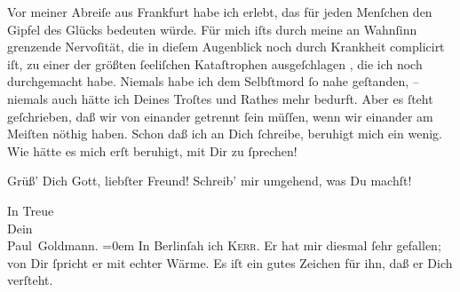 \pstart
           Vor meiner Abreiſe aus Frankfurt habe ich \label{K_L02875-2v}\label{K_L02875-2}
               erlebt, das für jeden Menſchen den Gipfel des Glücks bedeuten würde. Für mich iſts
               durch meine an Wahnſinn grenzende Nervoſität, die in dieſem Augenblick noch durch
               Krankheit complicirt iſt, zu einer der größten{ }ſeeliſchen Kataſtrophen ausgeſchlagen
                  , die ich noch durchgemacht habe. Niemals
               habe ich dem Selbſtmord{ }ſo nahe geſtanden, – niemals auch hätte ich Deines Troſtes
               und Rathes  mehr bedurft. Aber es{ }ſteht geſchrieben, daß wir von einander getrennt{ }ſein
               müſſen, wenn wir einander {\pb}am Meiſten nöthig haben.
               Schon daß ich an Dich{ }ſchreibe, beruhigt mich ein wenig. Wie hätte es mich erſt
               beruhigt, mit Dir zu{ }ſprechen!\pend
           
\pstart
           Grüß’ Dich Gott, liebſter Freund! Schreib’ mir umgehend, was Du machſt!\pend
           
\pstart
           In Treue {\\[\baselineskip]}Dein {\\[\baselineskip]}\spacefill\mbox{Paul Goldmann.}\pend
           \leftskip=0em{}
\pstart
           \noindent{}In Berlinſah ich \textsc{Kerr}. Er hat mir diesmal{ }ſehr gefallen; von Dir{ }ſpricht er mit echter Wärme. Es
                  iſt ein gutes Zeichen für ihn, daß er Dich verſteht.\pend
           \endnumbering{}  \newcommand{\dateiname}{L02875}\newcommand{\titel}{Paul Goldmann an Arthur Schnitzler, 20. 5. [1899]}\newcommand{\editorInnen}{Martin Anton Müller und Laura Untner}
